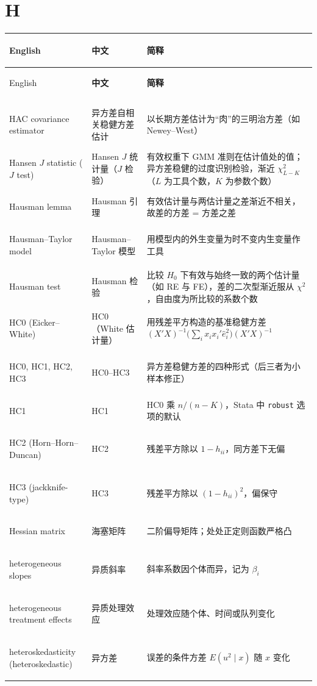 \section*{H}
\begin{longtable}{@{}>{\bfseries\boldmath\raggedright\arraybackslash}p{4.6cm}>{\raggedright\arraybackslash}p{3.2cm}>{\raggedright\arraybackslash}p{\dimexpr\textwidth-7.8cm-4\tabcolsep\relax}@{}}
\toprule
English & \textbf{中文} & \textbf{简释}\\
\midrule
\endfirsthead
\toprule
English & \textbf{中文} & \textbf{简释}\\
\midrule
\endhead
\midrule
\multicolumn{3}{r@{}}{\footnotesize\itshape （续下页）}\\
\endfoot
\bottomrule
\endlastfoot
HAC covariance estimator & 异方差自相关稳健方差估计 & 以长期方差估计为“肉”的三明治方差（如 Newey--West） \\
Hansen $J$ statistic ($J$ test) & Hansen $J$ 统计量（$J$ 检验） & 有效权重下 GMM 准则在估计值处的值；异方差稳健的过度识别检验，渐近 $\chi^2_{L-K}$（$L$ 为工具个数，$K$ 为参数个数） \\
Hausman lemma & Hausman 引理 & 有效估计量与两估计量之差渐近不相关，故差的方差 = 方差之差 \\
Hausman--Taylor model & Hausman--Taylor 模型 & 用模型内的外生变量为时不变内生变量作工具 \\
Hausman test & Hausman 检验 & 比较 $H_0$ 下有效与始终一致的两个估计量（如 RE 与 FE），差的二次型渐近服从 $\chi^2$，自由度为所比较的系数个数 \\
HC0 (Eicker--White) & HC0（White 估计量） & 用残差平方构造的基准稳健方差 $(X'X)^{-1}\big(\sum_ix_ix_i'\hat e_i^2\big)(X'X)^{-1}$ \\
HC0, HC1, HC2, HC3 & HC0--HC3 & 异方差稳健方差的四种形式（后三者为小样本修正） \\
HC1 & HC1 & HC0 乘 $n/(n-K)$，Stata 中 \texttt{robust} 选项的默认 \\
HC2 (Horn--Horn--Duncan) & HC2 & 残差平方除以 $1-h_{ii}$，同方差下无偏 \\
HC3 (jackknife-type) & HC3 & 残差平方除以 $(1-h_{ii})^2$，偏保守 \\
Hessian matrix & 海塞矩阵 & 二阶偏导矩阵；处处正定则函数严格凸 \\
heterogeneous slopes & 异质斜率 & 斜率系数因个体而异，记为 $\beta_i$ \\
heterogeneous treatment effects & 异质处理效应 & 处理效应随个体、时间或队列变化 \\
heteroskedasticity (heteroskedastic) & 异方差 & 误差的条件方差 $E(u^2\mid x)$ 随 $x$ 变化 \\

\end{longtable}
